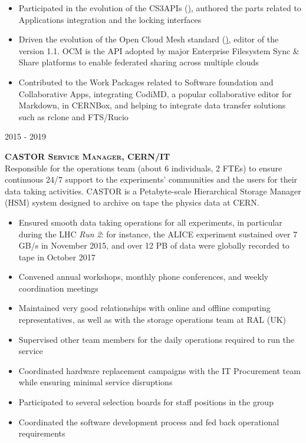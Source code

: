 \documentclass[11pt]{article}
\renewcommand{\subsection}[2]%
        {
         {\bf{\raggedright \scshape #1}}{\bf{\hfill \scshape #2}}\\[-.7\baselineskip]
}
\newenvironment{CompactItemize} {
  \begin{itemize}
  \setlength{\itemsep}{-3pt}
  \setlength{\parsep}{0pt}
  \setlength{\topsep}{-2pt}
  \setlength{\partopsep}{-2pt}
} {\end{itemize}}
\begin{document}
\begin{CompactItemize}
\item Participated in the evolution of the CS3APIs (\href{https://cs3org.github.io/cs3apis}), authored the parts related to Applications integration and the locking interfaces
\item Driven the evolution of the Open Cloud Mesh standard (\href{https://github.com/cs3org/OCM-API}), editor of the version 1.1. OCM is the API adopted by major Enterprise Filesystem Sync \& Share platforms to enable federated sharing across multiple clouds
\item Contributed to the Work Packages related to Software foundation and Collaborative Apps, integrating CodiMD, a popular collaborative editor for Markdown, in CERNBox, and helping to integrate data transfer solutions such as rclone and FTS/Rucio
\end{CompactItemize}

\subsection{2015 - 2019}{CASTOR Service Manager, CERN/IT}

Responsible for the operations team (about 6 individuals, 2 FTEs) to ensure continuous 24/7 support to the experiments' communities and the users for their data taking activities.
CASTOR is a Petabyte-scale Hierarchical Storage Manager (HSM) system designed to archive on tape the physics data at CERN.

\begin{CompactItemize}
\item Ensured smooth data taking operations for all experiments, in particular during the LHC \emph{Run 2}: for instance, the ALICE experiment sustained over 7 GB/s in November 2015, and over 12 PB of data were globally recorded to tape in October 2017
\item Convened annual workshops, monthly phone conferences, and weekly coordination meetings
\item Maintained very good relationships with online and offline computing representatives, as well as with the storage operations team at RAL (UK)
\item Supervised other team members for the daily operations required to run the service
\item Coordinated hardware replacement campaigns with the IT Procurement team while ensuring minimal service disruptions
\item Participated to several selection boards for staff positions in the group
\item Coordinated the software development process and fed back operational requirements
\end{CompactItemize}
\end{document}
